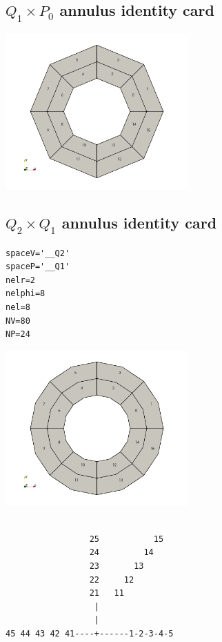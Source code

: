 \newpage
\subsection{$Q_1\times P_0$ annulus identity card}

\begin{center}
\includegraphics[width=7cm]{images/ELEFANT/annulus_Q1}
\end{center}




\newpage
\subsection{$Q_2\times Q_1$ annulus identity card}

\begin{small}
\begin{verbatim}
spaceV='__Q2'
spaceP='__Q1'
nelr=2
nelphi=8
nel=8
NV=80
NP=24
\end{verbatim}
\end{small}

\begin{center}
\includegraphics[width=7cm]{images/ELEFANT/annulus_Q2}
\end{center}

\begin{verbatim}

                 25           15
                 24         14
                 23       13
                 22     12
                 21   11
                  |     
                  |
45 44 43 42 41----+------1-2-3-4-5
\end{verbatim}




